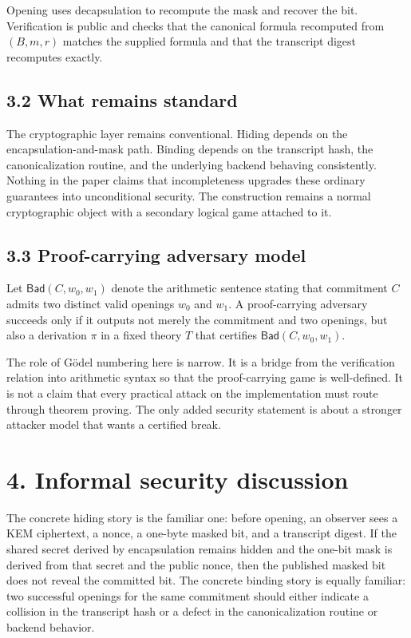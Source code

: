 \documentclass[
  11pt,
]{article}
\begin{document}
Opening uses decapsulation to recompute the mask and recover the bit.
Verification is public and checks that the canonical formula recomputed
from \((B,m,r)\) matches the supplied formula and that the transcript
digest recomputes exactly.

\subsection{3.2 What remains standard}\label{what-remains-standard}

The cryptographic layer remains conventional. Hiding depends on the
encapsulation-and-mask path. Binding depends on the transcript hash, the
canonicalization routine, and the underlying backend behaving
consistently. Nothing in the paper claims that incompleteness upgrades
these ordinary guarantees into unconditional security. The construction
remains a normal cryptographic object with a secondary logical game
attached to it.

\subsection{3.3 Proof-carrying adversary
model}\label{proof-carrying-adversary-model}

Let \(\mathsf{Bad}(C,w_0,w_1)\) denote the arithmetic sentence stating
that commitment \(C\) admits two distinct valid openings \(w_0\) and
\(w_1\). A proof-carrying adversary succeeds only if it outputs not
merely the commitment and two openings, but also a derivation \(\pi\) in
a fixed theory \(T\) that certifies \(\mathsf{Bad}(C,w_0,w_1)\).

The role of Gödel numbering here is narrow. It is a bridge from the
verification relation into arithmetic syntax so that the proof-carrying
game is well-defined. It is not a claim that every practical attack on
the implementation must route through theorem proving. The only added
security statement is about a stronger attacker model that wants a
certified break.

\section{4. Informal security
discussion}\label{informal-security-discussion}

The concrete hiding story is the familiar one: before opening, an
observer sees a KEM ciphertext, a nonce, a one-byte masked bit, and a
transcript digest. If the shared secret derived by encapsulation remains
hidden and the one-bit mask is derived from that secret and the public
nonce, then the published masked bit does not reveal the committed bit.
The concrete binding story is equally familiar: two successful openings
for the same commitment should either indicate a collision in the
transcript hash or a defect in the canonicalization routine or backend
behavior.
\end{document}

